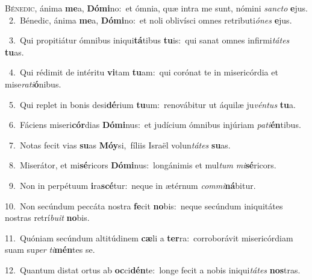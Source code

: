 \lettrine{\initial\textcolor{\initialcolor}{B}}{énedic,} ánima \textbf{me}\-a, \textbf{Dó}\-\textbf{mi}no:~\star et ómnia, quæ intra me sunt, nómini \textit{sanc}\-\textit{to} \textbf{e}\-jus.\\
{\numbfont\textcolor{\numbcolor}{~2.}}~Bénedic, ánima \textbf{me}\-a, \textbf{Dó}\-\textbf{mi}no:~\star et noli oblivísci omnes retributi\-\textit{ó}\-\textit{nes} \textbf{e}\-jus.\par
{\numbfont\textcolor{\numbcolor}{~3.}}~Qui propitiátur ómnibus iniqui\-\textbf{tá}\-tibus \textbf{tu}\-is:~\star qui sanat omnes infirmi\-\textit{tá}\-\textit{tes} \textbf{tu}\-as.\par
{\numbfont\textcolor{\numbcolor}{~4.}}~Qui rédimit de intéritu \textbf{vi}\-tam \textbf{tu}\-am:~\star qui corónat te in misericórdia et mise\-\textit{ra}\-\textit{ti}\textbf{ó}nibus.\par
{\numbfont\textcolor{\numbcolor}{~5.}}~Qui replet in bonis desi\-\textbf{dé}\-rium \textbf{tu}\-um:~\star renovábitur ut áquilæ ju\-\textit{vén}\-\textit{tus} \textbf{tu}\-a.\par
{\numbfont\textcolor{\numbcolor}{~6.}}~Fáciens miseri\-\textbf{cór}\-dias \textbf{Dó}\-\textbf{mi}nus:~\star et judícium ómnibus injúriam \textit{pa}\-\textit{ti}\textbf{én}tibus.\par
{\numbfont\textcolor{\numbcolor}{~7.}}~Notas fecit vias \textbf{su}\-as \textbf{Mó}\-\textbf{y}si,~\star fíliis Israël volun\-\textit{tá}\-\textit{tes} \textbf{su}\-as.\par
{\numbfont\textcolor{\numbcolor}{~8.}}~Miserátor, et mi\-\textbf{sé}\-ricors \textbf{Dó}\-\textbf{mi}nus:~\star longánimis et mul\textit{tum} \textit{mi}\-\textbf{sé}ricors.\par
{\numbfont\textcolor{\numbcolor}{~9.}}~Non in perpétuum \textbf{i}\-ra\-\textbf{scé}\-tur:~\star neque in ætérnum \textit{com}\-\textit{mi}\textbf{ná}bitur.\par
{\numbfont\textcolor{\numbcolor}{10.}}~Non secúndum peccáta nostra \textbf{fe}\-cit \textbf{no}\-bis:~\star neque secúndum iniquitátes nostras retrí\-\textit{bu}\-\textit{it} \textbf{no}\-bis.\par
{\numbfont\textcolor{\numbcolor}{11.}}~Quóniam secúndum altitúdinem \textbf{cæ}\-li a \textbf{ter}\-ra:~\star corroborávit misericórdiam suam su\textit{per} \textit{ti}\-\textbf{mén}tes se.\par
{\numbfont\textcolor{\numbcolor}{12.}}~Quantum distat ortus ab \textbf{oc}\-ci\-\textbf{dén}\-te:~\star longe fecit a nobis iniqui\-\textit{tá}\-\textit{tes} \textbf{nos}\-tras.\par
